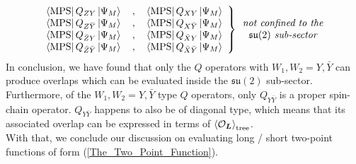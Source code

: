%
%
\begin{equation}
\left. \begin{array}{c}
\bra{\text{MPS}} Q_{ZY} \ket{\Psi_M} 
%
\quad , \quad
%
\bra{\text{MPS}} Q_{XY} \ket{\Psi_M} 
\\
\bra{\text{MPS}} Q_{Z\bar{Y}} \ket{\Psi_M} 
%
\quad , \quad
%
\bra{\text{MPS}} Q_{X\bar{Y}} \ket{\Psi_M} 
\\
\bra{\text{MPS}} Q_{\bar{Z}Y} \ket{\Psi_M} 
%
\quad , \quad
%
\bra{\text{MPS}} Q_{\bar{X}Y} \ket{\Psi_M} 
\\
\bra{\text{MPS}} Q_{\bar{Z}\bar{Y}} \ket{\Psi_M} 
%
\quad , \quad
%
\bra{\text{MPS}} Q_{\bar{X}\bar{Y}} \ket{\Psi_M} 
\end{array} \right\rbrace
\begin{array}{c}
\textit{not confined to the} \\
\mathfrak{su}(2) \textit{ sub-sector}
\end{array}
\end{equation}
%
%
In conclusion, we have found that only the $Q$ operators with $W_1,W_2 = Y, \bar{Y}$ can produce overlaps which can be evaluated inside the $\mathfrak{su}(2)$ sub-sector. Furthermore, of the $W_1,W_2 = Y, \bar{Y}$ type $Q$ operators, only $Q_{Y \bar{Y}}$ is a proper spin-chain operator. $Q_{Y \bar{Y}}$ happens to also be of diagonal type, which means that its associated overlap can be expressed in terms of $\expval{\mathcal{O}_{\boldsymbol{L}}}_{\text{tree}}$.\\
With that, we conclude our discussion on evaluating long / short two-point functions of form (\ref{The_Two_Point_Function}).

